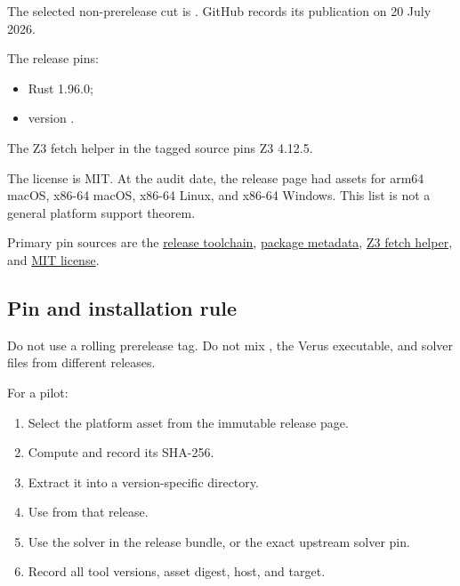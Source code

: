 \documentclass[11pt]{article}
\begin{document}
The selected non-prerelease cut is
\href{https://github.com/verus-lang/verus/releases/tag/release/0.2026.07.18.3a4d30b}
{}.  GitHub records its publication on 20 July 2026.

The release pins:
\begin{itemize}[leftmargin=*]
  \item Rust 1.96.0;
  \item {} version .
\end{itemize}

The Z3 fetch helper in the tagged source pins Z3 4.12.5.

The license is MIT.  At the audit date, the release page had assets for arm64 macOS, x86-64
macOS, x86-64 Linux, and x86-64 Windows.  This list is not a general platform support theorem.

Primary pin sources are the
\href{https://raw.githubusercontent.com/verus-lang/verus/release/0.2026.07.18.3a4d30b/rust-toolchain.toml}
{release toolchain},
\href{https://raw.githubusercontent.com/verus-lang/verus/release/0.2026.07.18.3a4d30b/source/vstd/Cargo.toml}
{ package metadata},
\href{https://raw.githubusercontent.com/verus-lang/verus/release/0.2026.07.18.3a4d30b/.github/workflows/get-z3.sh}
{Z3 fetch helper}, and
\href{https://raw.githubusercontent.com/verus-lang/verus/release/0.2026.07.18.3a4d30b/LICENSE}
{MIT license}.

\subsection{Pin and installation rule}

Do not use a rolling prerelease tag.  Do not mix , the Verus executable, and solver
files from different releases.

For a pilot:
\begin{enumerate}[leftmargin=*]
  \item Select the platform asset from the immutable release page.
  \item Compute and record its SHA-256.
  \item Extract it into a version-specific directory.
  \item Use  from that release.
  \item Use the solver in the release bundle, or the exact upstream solver pin.
  \item Record all tool versions, asset digest, host, and target.
\end{enumerate}
\end{document}

